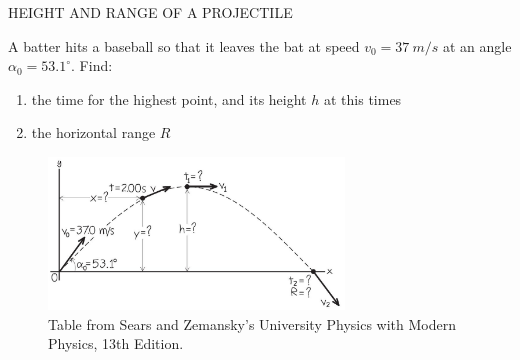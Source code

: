 \documentclass[]{beamer}
\begin{document}
\begin{frame}
    HEIGHT AND RANGE OF A PROJECTILE

    \vspace{3mm}

  \pause


  A batter hits a baseball so that it leaves the bat at speed $v_0=37~m/s$
at an angle $\alpha_0=53.1^{\circ}$. Find: 
\vspace{3mm}

\begin{enumerate}
    \item the time for  the highest point, and its
    height $h$ at this times
    \item   the horizontal range $R$  
\end{enumerate}
    

    
\vspace{3mm}

\begin{figure}[h!]  
    \includegraphics[width=0.7\textwidth]{images/23.jpg}
     \caption{ {\tiny Table from Sears and Zemansky's University Physics 
     with Modern Physics, 13th Edition.} }
  \end{figure}
    

       
       \end{frame}





\end{document}
